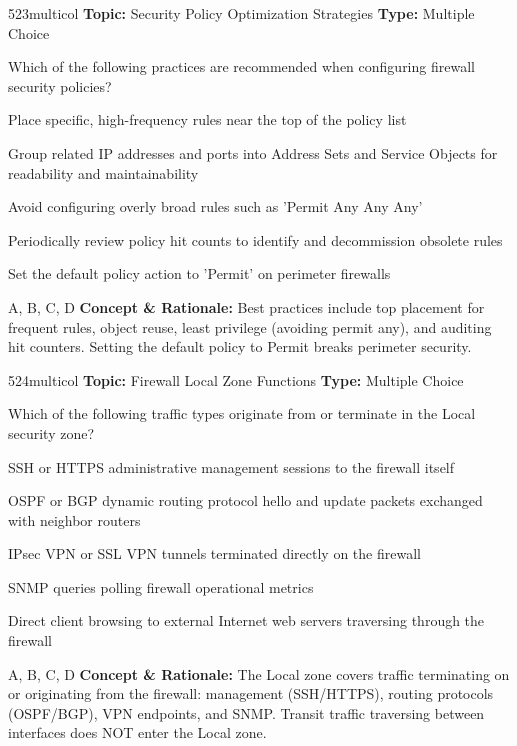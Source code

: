 \begin{qcard}{523}{multicol}
\textcolor{darkslate!75}{\small\textbf{Topic:} Security Policy Optimization Strategies \hfill \textbf{Type:} Multiple Choice}\vspace{0.4em}\par
Which of the following practices are recommended when configuring firewall security policies?
\begin{qoptions}
\item Place specific, high-frequency rules near the top of the policy list
\item Group related IP addresses and ports into Address Sets and Service Objects for readability and maintainability
\item Avoid configuring overly broad rules such as 'Permit Any Any Any'
\item Periodically review policy hit counts to identify and decommission obsolete rules
\item Set the default policy action to 'Permit' on perimeter firewalls
\end{qoptions}
\end{qcard}
\nopagebreak
\begin{explainbox}{A, B, C, D}
\textbf{Concept \& Rationale:} Best practices include top placement for frequent rules, object reuse, least privilege (avoiding permit any), and auditing hit counters. Setting the default policy to Permit breaks perimeter security.
\end{explainbox}

\begin{qcard}{524}{multicol}
\textcolor{darkslate!75}{\small\textbf{Topic:} Firewall Local Zone Functions \hfill \textbf{Type:} Multiple Choice}\vspace{0.4em}\par
Which of the following traffic types originate from or terminate in the Local security zone?
\begin{qoptions}
\item SSH or HTTPS administrative management sessions to the firewall itself
\item OSPF or BGP dynamic routing protocol hello and update packets exchanged with neighbor routers
\item IPsec VPN or SSL VPN tunnels terminated directly on the firewall
\item SNMP queries polling firewall operational metrics
\item Direct client browsing to external Internet web servers traversing through the firewall
\end{qoptions}
\end{qcard}
\nopagebreak
\begin{explainbox}{A, B, C, D}
\textbf{Concept \& Rationale:} The Local zone covers traffic terminating on or originating from the firewall: management (SSH/HTTPS), routing protocols (OSPF/BGP), VPN endpoints, and SNMP. Transit traffic traversing between interfaces does NOT enter the Local zone.
\end{explainbox}

